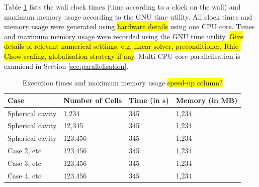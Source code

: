 \documentclass[sn-mathphys,Numbered,draft]{sn-jnl}%
\begin{document}
Table \ref{tab:times_memory} lists the wall clock times (time according to a clock on the wall) and maximum memory usage according to the GNU time utility.
All clock times and memory usage were generated using \hl{hardware details} using one CPU core.
Times and maximum memory usage were recorded using the GNU time utility.
\hl{Give details of relevant numerical settings, e.g. linear solver, preconditioner, Rhie-Chow scaling, globalisation strategy if any}.
Multi-CPU-core parallelisation is examiend in Section \ref{sec:parallelisation}.
\begin{table}[htb]
	\centering
		\begin{tabular}{llll}
			\hline
			Case & Number of Cells & Time (in s) & Memory (in MB) \\
			\hline 
			Spherical cavity & 1,234 & 345 & 1,234  \\
			Spherical cavity & 12,345 & 345 & 1,234  \\
			Spherical cavity & 123,456 & 345 & 1,234  \\
			Case 2, etc & 123,456 & 345 & 1,234  \\
			Case 3, etc & 123,456 & 345 & 1,234  \\
			Case 4, etc & 123,456 & 345 & 1,234  \\
			\hline
		\end{tabular}
	\caption{Execution times and maximum memory usage \hl{speed-up column?}}
	\label{tab:times_memory}
\end{table}
\end{document}
